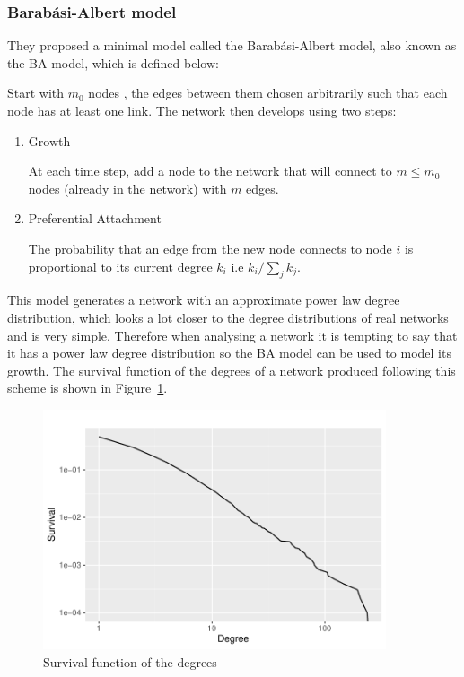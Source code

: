\documentclass[
]{article}
\begin{document}
\hypertarget{barabuxe1si-albert-model}{%
\subsubsection{Barabási-Albert model}\label{barabuxe1si-albert-model}}

They proposed a minimal model called the Barabási-Albert model, also
known as the BA model, which is defined below:

Start with \(m_0\) nodes , the edges between them chosen arbitrarily
such that each node has at least one link. The network then develops
using two steps:

\begin{enumerate}
\def\labelenumi{\arabic{enumi}.}
\item
  Growth

  At each time step, add a node to the network that will connect to
  \(m\le m_0\) nodes (already in the network) with \(m\) edges.
\item
  Preferential Attachment

  The probability that an edge from the new node connects to node \(i\)
  is proportional to its current degree \(k_i\) i.e \(k_i/\sum_{j}k_j\).
\end{enumerate}

This model generates a network with an approximate power law degree
distribution, which looks a lot closer to the degree distributions of
real networks and is very simple. Therefore when analysing a network it
is tempting to say that it has a power law degree distribution so the BA
model can be used to model its growth. The survival function of the
degrees of a network produced following this scheme is shown in
Figure~\ref{fig-surv-sim}.

\begin{figure}[H]

{\centering \includegraphics[width=0.9\textwidth,height=\textheight]{proposal_files/figure-pdf/fig-surv-sim-1.pdf}

}

\caption{\label{fig-surv-sim}Survival function of the degrees}

\end{figure}
\end{document}
